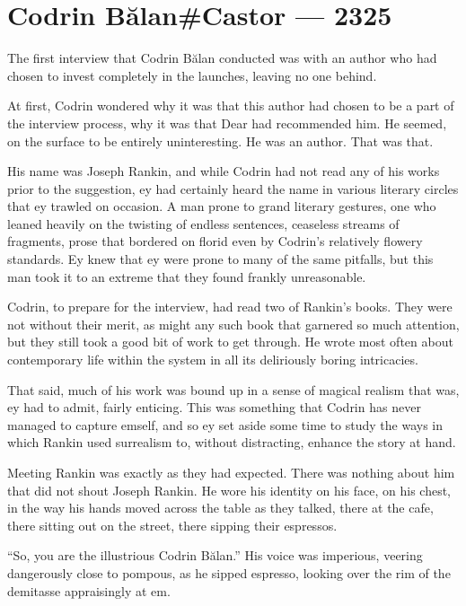 \hypertarget{codrin-bux103lancastor-2325}{%
\chapter{Codrin Bălan\#Castor — 2325}\label{codrin-bux103lancastor-2325}}

The first interview that Codrin Bălan conducted was with an author who had chosen to invest completely in the launches, leaving no one behind.

At first, Codrin wondered why it was that this author had chosen to be a part of the interview process, why it was that Dear had recommended him. He seemed, on the surface to be entirely uninteresting. He was an author. That was that.

His name was Joseph Rankin, and while Codrin had not read any of his works prior to the suggestion, ey had certainly heard the name in various literary circles that ey trawled on occasion. A man prone to grand literary gestures, one who leaned heavily on the twisting of endless sentences, ceaseless streams of fragments, prose that bordered on florid even by Codrin's relatively flowery standards. Ey knew that ey were prone to many of the same pitfalls, but this man took it to an extreme that they found frankly unreasonable.

Codrin, to prepare for the interview, had read two of Rankin's books. They were not without their merit, as might any such book that garnered so much attention, but they still took a good bit of work to get through. He wrote most often about contemporary life within the system in all its deliriously boring intricacies.

That said, much of his work was bound up in a sense of magical realism that was, ey had to admit, fairly enticing. This was something that Codrin has never managed to capture emself, and so ey set aside some time to study the ways in which Rankin used surrealism to, without distracting, enhance the story at hand.

Meeting Rankin was exactly as they had expected. There was nothing about him that did not shout Joseph Rankin. He wore his identity on his face, on his chest, in the way his hands moved across the table as they talked, there at the cafe, there sitting out on the street, there sipping their espressos.

``So, you are the illustrious Codrin Bălan.'' His voice was imperious, veering dangerously close to pompous, as he sipped espresso, looking over the rim of the demitasse appraisingly at em.

